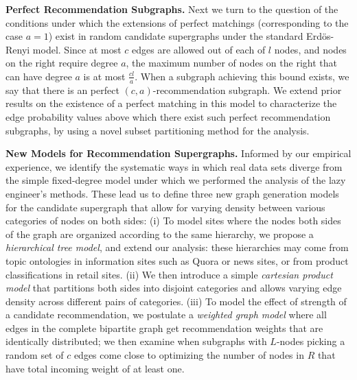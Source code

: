 \noindent
{\bf Perfect Recommendation Subgraphs.} Next we turn to the question of the conditions under which the extensions of perfect matchings (corresponding to the case $a=1$) exist in random candidate supergraphs under the standard Erd\"os-Renyi model. Since at most $c$ edges are allowed out of each of $l$ nodes, and nodes on the right require degree $a$, the maximum number of nodes on the right that can have degree $a$ is at most $\frac{cl}{a}$. When a subgraph achieving this bound exists, we say that there is an perfect $(c,a)$-recommendation subgraph. We extend prior results on the
existence of a perfect matching in this model to characterize the edge probability values above which there exist such perfect recommendation subgraphs, by using a novel subset partitioning method for the analysis. \vs
 

\noindent
{\bf New Models for Recommendation Supergraphs.}
Informed by our empirical experience, we identify the systematic ways in which real data sets diverge from the simple fixed-degree model under which we performed the analysis of the lazy engineer's methods. These lead us to define three new graph generation models for the candidate supergraph that allow for varying density between various categories of nodes on both sides: (i) To model sites where the nodes both sides of the graph are organized according to the same hierarchy,
we propose a {\em hierarchical tree model}, and extend our analysis: these hierarchies may come from topic ontologies in information sites such as Quora or news sites, or from product classifications in retail sites.
(ii) We then introduce a simple {\em cartesian product model} that partitions both sides into disjoint categories
and allows varying edge density across different pairs of
categories. (iii) To model the effect of strength of a candidate recommendation, we postulate a {\em weighted graph model} where all edges in the complete bipartite graph get recommendation weights that are identically distributed; we then examine when subgraphs with $L$-nodes picking a random set of $c$ edges come close to optimizing the number of nodes in $R$ that have total incoming weight of at least one. \vs

